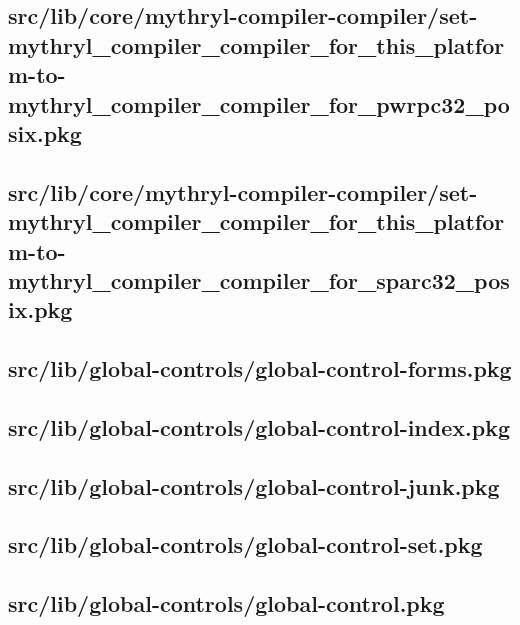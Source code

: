 \subsection{src/lib/core/mythryl-compiler-compiler/set-mythryl\_compiler\_compiler\_for\_this\_platform-to-mythryl\_compiler\_compiler\_for\_pwrpc32\_posix.pkg}


\subsection{src/lib/core/mythryl-compiler-compiler/set-mythryl\_compiler\_compiler\_for\_this\_platform-to-mythryl\_compiler\_compiler\_for\_sparc32\_posix.pkg}


\subsection{src/lib/global-controls/global-control-forms.pkg}


\subsection{src/lib/global-controls/global-control-index.pkg}


\subsection{src/lib/global-controls/global-control-junk.pkg}


\subsection{src/lib/global-controls/global-control-set.pkg}


\subsection{src/lib/global-controls/global-control.pkg}


